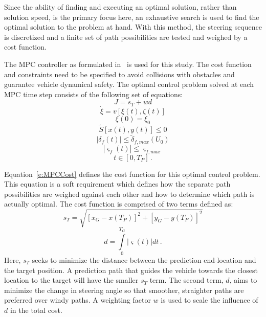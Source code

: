 \documentclass[12pt,onecolumn]{report}
\begin{document}
Since the ability of finding and executing an optimal solution, rather than solution speed, is the primary focus here, an exhaustive search is used to find the optimal solution to the problem at hand. With this method, the steering sequence is discretized and a finite set of path possibilities are tested and weighed by a cost function. 

The MPC controller as formulated in~\cite{ModelFidelity2016} is used for this study. The cost function and constraints need to be specified to avoid collisions with obstacles and guarantee vehicle dynamical safety. The optimal control problem solved at each MPC time step consists of the following set of equations:
%
\begin{equation}\label{e:MPCCost}
J = s_T + wd 
\end{equation}
\begin{equation}\label{e:State_ODE}
\dot{\xi} = v\left[\xi\left(t\right),\zeta\left(t\right)\right] 
\end{equation}
\begin{equation}\label{e:InitialStates}
\xi\left(0\right) = \xi_0 
\end{equation}
\begin{equation}\label{e:SafeArea}
\tilde{S}\left[x\left(t\right),y\left(t\right)\right] \leq0  
\end{equation}
\begin{equation}\label{e:SteerLimit}
\left|\delta_f\left(t\right)\right| \leq\tilde{\delta}_{f,max}\left(U_0\right) 
\end{equation}
\begin{equation}\label{e:SteerRateLimit}
\left|\varsigma_f\left(t\right)\right| \leq\varsigma_{f,max} 
\end{equation}
\begin{equation}\label{e:TimeDomain}
t \in \left[0,T_P\right] \,.
\end{equation}

Equation~\ref{e:MPCCost} defines the cost function for this optimal control problem. This equation is a soft requirement which defines how the separate path possibilities are weighed against each other and how to determine which path is actually optimal. The cost function is comprised of two terms defined as:
%
\begin{equation}\label{e:DistanceCost}
s_T = \sqrt{\left[ x_G - x\left(T_P\right)\right]^2 + \left[y_G - y\left(T_P\right)\right]^2 }
\end{equation}
\begin{equation}\label{e:TurningCost}
d = \int \limits_0^{T_G} \left|\varsigma\left(t\right)\right| dt \,.
\end{equation}
%
Here, $s_{T}$ seeks to minimize the distance between the prediction end-location and the target position. A prediction path that guides the vehicle towards the closest location to the target will have the smaller $s_{T}$ term. The second term, $d$, aims to minimize the change in steering angle so that smoother, straighter paths are preferred over windy paths. A weighting factor $w$ is used to scale the influence of $d$ in the total cost.
\end{document}
